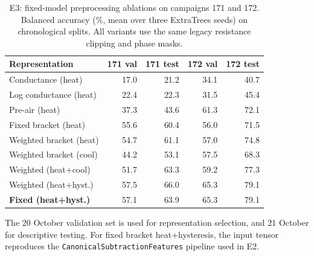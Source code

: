 \begin{table}[t]
\centering\small
\caption{E3: fixed-model preprocessing ablations on campaigns 171 and 172.
Balanced accuracy (\%, mean over three ExtraTrees seeds) on chronological splits.
All variants use the same legacy resistance clipping and phase masks.}
\label{tab:e3_ablation}
\begin{tabular}{@{}lrrrr@{}}
\toprule
Representation & 171 val & 171 test & 172 val & 172 test \\
\midrule
Conductance (heat) & 17.0 & 21.2 & 34.1 & 40.7 \\
Log conductance (heat) & 22.4 & 22.3 & 31.5 & 45.4 \\
Pre-air (heat) & 37.3 & 43.6 & 61.3 & 72.1 \\
Fixed bracket (heat) & 55.6 & 60.4 & 56.0 & 71.5 \\
Weighted bracket (heat) & 54.7 & 61.1 & 57.0 & 74.8 \\
Weighted bracket (cool) & 44.2 & 53.1 & 57.5 & 68.3 \\
Weighted (heat{+}cool) & 51.7 & 63.3 & 59.2 & 77.3 \\
Weighted (heat{+}hyst.) & 57.5 & 66.0 & 65.3 & 79.1 \\
\textbf{Fixed (heat{+}hyst.)} & 57.1 & 63.9 & 65.3 & 79.1 \\
\bottomrule
\end{tabular}
\vspace{2pt}
\parbox{0.98\textwidth}{\footnotesize The 20 October validation set is
used for representation selection, and 21 October for descriptive testing.
For fixed bracket heat+hysteresis, the input tensor reproduces the
\texttt{CanonicalSubtractionFeatures} pipeline used in E2.}
\end{table}
